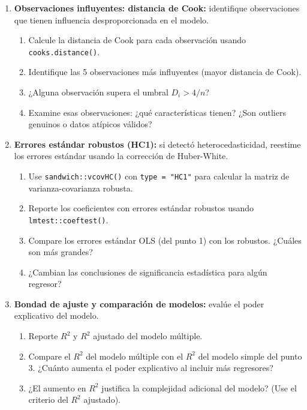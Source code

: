 \documentclass[11pt, a4paper]{article}
\begin{document}
\begin{enumerate}[label=\arabic*)]
  \item \textbf{Observaciones influyentes: distancia de Cook:} identifique
        observaciones que tienen influencia desproporcionada en el modelo.
        \begin{enumerate}[label=\alph*)]
          \item Calcule la distancia de Cook para cada observaci\'on usando
                \texttt{cooks.distance()}.
          \item Identifique las 5 observaciones m\'as influyentes (mayor
                distancia de Cook).
          \item ¿Alguna observaci\'on supera el umbral $D_i > 4/n$?
          \item Examine esas observaciones: ¿qu\'e caracter\'isticas tienen?
                ¿Son outliers genuinos o datos at\'ipicos v\'alidos?
        \end{enumerate}

  \item \textbf{Errores est\'andar robustos (HC1):} si detect\'o
        heterocedasticidad, reestime los errores est\'andar usando la
        correcci\'on de Huber-White.
        \begin{enumerate}[label=\alph*)]
          \item Use \texttt{sandwich::vcovHC()} con \texttt{type = "HC1"}
                para calcular la matriz de varianza-covarianza robusta.
          \item Reporte los coeficientes con errores est\'andar robustos
                usando \texttt{lmtest::coeftest()}.
          \item Compare los errores est\'andar OLS (del punto 1) con los
                robustos. ¿Cu\'ales son m\'as grandes?
          \item ¿Cambian las conclusiones de significancia estad\'istica para
                alg\'un regresor?
        \end{enumerate}

  \item \textbf{Bondad de ajuste y comparaci\'on de modelos:} eval\'ue el
        poder explicativo del modelo.
        \begin{enumerate}[label=\alph*)]
          \item Reporte $R^2$ y $R^2$ ajustado del modelo m\'ultiple.
          \item Compare el $R^2$ del modelo m\'ultiple con el $R^2$ del modelo
                simple del punto 3. ¿Cu\'anto aumenta el poder explicativo al
                incluir m\'as regresores?
          \item ¿El aumento en $R^2$ justifica la complejidad adicional del
                modelo? (Use el criterio del $R^2$ ajustado).
        \end{enumerate}


\end{enumerate}
\end{document}
